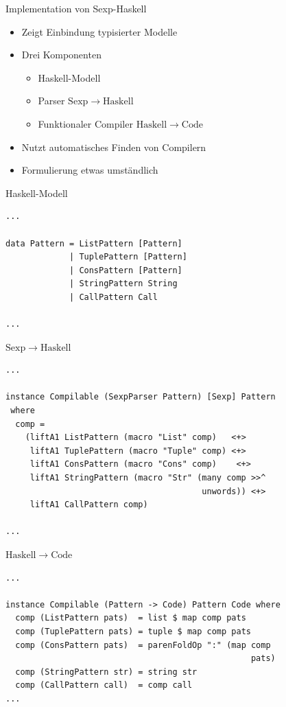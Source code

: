 \documentclass{beamer}
\newcommand{\pfeil}{\item[$\Rightarrow$]}
\newcommand\ato{\rightarrow} %
\begin{document}
\begin{frame}[fragile]{Implementation von Sexp-Haskell}
  \begin{itemize}
  \item Zeigt Einbindung typisierter Modelle
  \item Drei Komponenten
    \begin{itemize}
    \item Haskell-Modell
    \item Parser $\mathrm{Sexp} \ato \mathrm{Haskell}$
    \item Funktionaler Compiler $\mathrm{Haskell} \ato \mathrm{Code}$
    \end{itemize}
  \item Nutzt automatisches Finden von Compilern
  \pfeil Formulierung etwas umständlich
  \end{itemize}
\end{frame}

\begin{frame}[fragile]{Haskell-Modell}
\begin{verbatim}
...

data Pattern = ListPattern [Pattern]
             | TuplePattern [Pattern]
             | ConsPattern [Pattern]
             | StringPattern String
             | CallPattern Call                          

...
\end{verbatim}
\end{frame}

\begin{frame}[fragile]{$\mathrm{Sexp} \ato \mathrm{Haskell}$}
\begin{verbatim}
...

instance Compilable (SexpParser Pattern) [Sexp] Pattern 
 where
  comp =
    (liftA1 ListPattern (macro "List" comp)   <+>
     liftA1 TuplePattern (macro "Tuple" comp) <+>
     liftA1 ConsPattern (macro "Cons" comp)    <+>
     liftA1 StringPattern (macro "Str" (many comp >>^ 
                                        unwords)) <+>
     liftA1 CallPattern comp)

...
\end{verbatim}
\end{frame}

\begin{frame}[fragile]{$\mathrm{Haskell} \ato \mathrm{Code}$}
\begin{verbatim}
...

instance Compilable (Pattern -> Code) Pattern Code where
  comp (ListPattern pats)  = list $ map comp pats
  comp (TuplePattern pats) = tuple $ map comp pats
  comp (ConsPattern pats)  = parenFoldOp ":" (map comp
                                                  pats)
  comp (StringPattern str) = string str
  comp (CallPattern call)  = comp call
...

\end{verbatim}
\end{frame}
\end{document}
